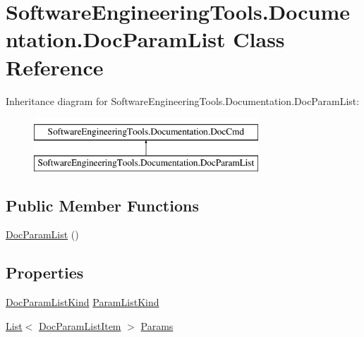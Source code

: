 \hypertarget{class_software_engineering_tools_1_1_documentation_1_1_doc_param_list}{\section{Software\+Engineering\+Tools.\+Documentation.\+Doc\+Param\+List Class Reference}
\label{class_software_engineering_tools_1_1_documentation_1_1_doc_param_list}
}
Inheritance diagram for Software\+Engineering\+Tools.\+Documentation.\+Doc\+Param\+List\+:\begin{figure}[H]
\begin{center}
\leavevmode
\includegraphics[height=2.000000cm]{class_software_engineering_tools_1_1_documentation_1_1_doc_param_list}
\end{center}
\end{figure}
\subsection*{Public Member Functions}
\begin{DoxyCompactItemize}
\item 
\hyperlink{class_software_engineering_tools_1_1_documentation_1_1_doc_param_list_a73c7e9030279243ecf33ebb17cb5deb5}{Doc\+Param\+List} ()
\end{DoxyCompactItemize}
\subsection*{Properties}
\begin{DoxyCompactItemize}
\item 
\hyperlink{namespace_software_engineering_tools_1_1_documentation_a386ec98ace7dcc510b3dc1035c7bfb15}{Doc\+Param\+List\+Kind} \hyperlink{class_software_engineering_tools_1_1_documentation_1_1_doc_param_list_a83d72ccd96d99a45780852569978025b}{Param\+List\+Kind}
\item 
\hyperlink{namespace_software_engineering_tools_1_1_documentation_ae0bccf4f49a76db084c1c316e5954ec9a4ee29ca12c7d126654bd0e5275de6135}{List}$<$ \hyperlink{class_software_engineering_tools_1_1_documentation_1_1_doc_param_list_item}{Doc\+Param\+List\+Item} $>$ \hyperlink{class_software_engineering_tools_1_1_documentation_1_1_doc_param_list_a2c0a39217a99edd79f005ee66acd3137}{Params}
\end{DoxyCompactItemize}


